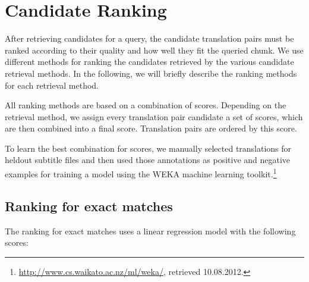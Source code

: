\newpage
\section{Candidate Ranking}
\label{sec:ranking}

After retrieving candidates for a query, the candidate translation pairs must be ranked according to their quality and how well they fit the queried chunk. We use different methods for ranking the candidates retrieved by the various candidate retrieval methods. In the following, we will briefly describe the ranking methods for each retrieval method.

All ranking methods are based on a combination of scores. Depending on the retrieval method, we assign every translation pair candidate a set of scores, which are then combined into a final score.  Translation pairs are ordered by this score.

To learn the best combination for scores, we manually selected translations for heldout subtitle files and then used those annotations as positive and negative examples for training a model using the WEKA machine learning toolkit.\footnote{\url{http://www.cs.waikato.ac.nz/ml/weka/}, retrieved 10.08.2012.}


\subsection{Ranking for exact matches}

The ranking for exact matches uses a linear regression model with the following scores:

